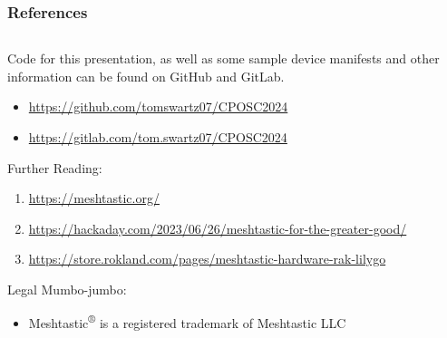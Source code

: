 \documentclass[aspectratio=169]{beamer}
\begin{document}
\begin{frame}
  \frametitle{References}
  \begin{columns}[]
    \begin{column}[T]{0.55\paperwidth}
      Code for this presentation, as well as some sample device manifests and other
      information can be found on GitHub and GitLab.
      \begin{itemize}
        \item{\href{https://github.com/tomswartz07/CPOSC2024}{https://github.com/tomswartz07/CPOSC2024}}
        \item{\href{https://gitlab.com/tom.swartz07/CPOSC2024}{https://gitlab.com/tom.swartz07/CPOSC2024}}
      \end{itemize}
      \vfill{}
      Further Reading:
      \begin{enumerate}
        \item{\href{https://meshtastic.org/}{https://meshtastic.org/}}
        \item{\href{https://hackaday.com/2023/06/26/meshtastic-for-the-greater-good/}{https://hackaday.com/2023/06/26/meshtastic-for-the-greater-good/}}
        \item{\href{https://store.rokland.com/pages/meshtastic-hardware-rak-lilygo}{https://store.rokland.com/pages/meshtastic-hardware-rak-lilygo}}
      \end{enumerate}
      \tiny{Legal Mumbo-jumbo:}
      \vfill{}
      \begin{itemize}
        \item{\tiny{Meshtastic\textsuperscript{\textsf{®}} is a registered trademark of Meshtastic LLC}}
      \end{itemize}
    \end{column}
    \begin{column}[T]{0.35\paperwidth}
    \end{column}
  \end{columns}
\end{frame}
\end{document}
